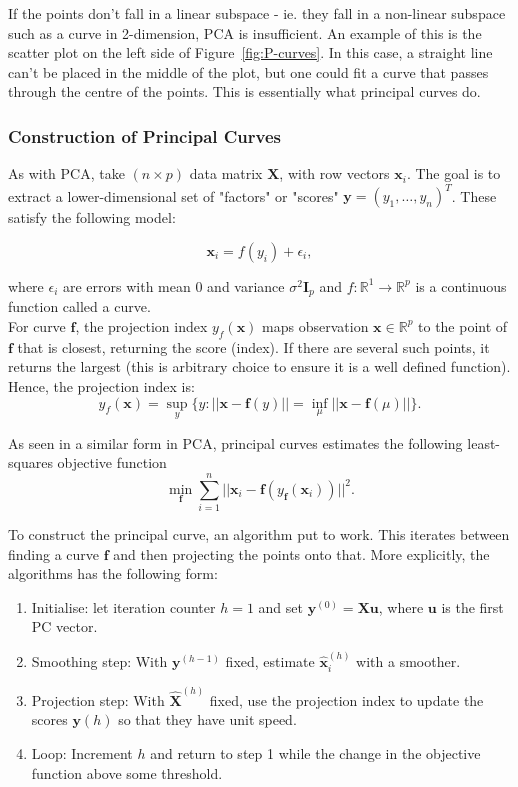 \documentclass{article}\usepackage[]{graphicx}\usepackage[]{xcolor}
\numberwithin{equation}{section}
\begin{document}
{\noindent If the points don't fall in a linear subspace - ie. they fall in a non-linear subspace such as a curve in 2-dimension, PCA is insufficient. An example of this is the scatter plot on the left side of Figure~\ref{fig:P-curves}. In this case, a straight line can't be placed in the middle of the plot, but one could fit a curve that passes through the centre of the points. This is essentially what principal curves do.

\subsubsection{Construction of Principal Curves}

\noindent As with PCA, take $(n \times p)$ data matrix $\mathbf{X}$, with row vectors $\mathbf{x}_i$. The goal is to extract a lower-dimensional set of "factors" or "scores" $\mathbf{y} = (y_1, \dots, y_n)^T$. These satisfy the following model:

\[
\mathbf{x}_i = f(y_i) + \epsilon_i, 
\]

\noindent where $\epsilon_i$ are errors with mean 0 and variance $\sigma^2 \mathbf{I}_p$ and $f: \mathbb{R}^1 \rightarrow \mathbb{R}^p$ is a continuous function called a curve.\\

\noindent For curve $\mathbf{f}$, the projection index $y_f(\mathbf{x})$ maps observation $\mathbf{x} \in \mathbb{R}^p$ to the point of $\mathbf{f}$ that is closest, returning the score (index). If there are several such points, it returns the largest (this is arbitrary choice to ensure it is a well defined function). Hence, the projection index is: 
\[
y_f(\mathbf{x}) = \sup\limits_{y}\{y: ||\mathbf{x}-\mathbf{f}(y)||= \inf\limits_{\mu}||\mathbf{x}-\mathbf{f}(\mu)||\}.
\]

\noindent As seen in a similar form in PCA, principal curves estimates the following least-squares objective function
\[
\min\limits_{\mathbf{f}}\sum_{i=1}^{n} ||\mathbf{x}_i - \mathbf{f}(y_{\mathbf{f}}(\mathbf{x}_i))||^2.
\]

\noindent To construct the principal curve, an algorithm put to work. This iterates between finding a curve $\mathbf{f}$ and then projecting the points onto that. More explicitly, the algorithms has the following form: %

\begin{enumerate}
  \item Initialise: let iteration counter $h = 1$ and set $\mathbf{y}^{(0)} = \mathbf{Xu}$, where $\mathbf{u}$ is the first PC vector. 
  \item Smoothing step: With $\mathbf{y}^{(h-1)}$ fixed, estimate $\mathbf{\hat{x}}_i^{(h)}$ with a smoother. 
  \item Projection step: With $\mathbf{\hat{X}}^{(h)}$ fixed, use the projection index to update the scores $\mathbf{y}{(h)}$ so that they have unit speed. 
  \item Loop: Increment $h$ and return to step 1 while the change in the objective function above some threshold.
\end{enumerate}

}
\end{document}
